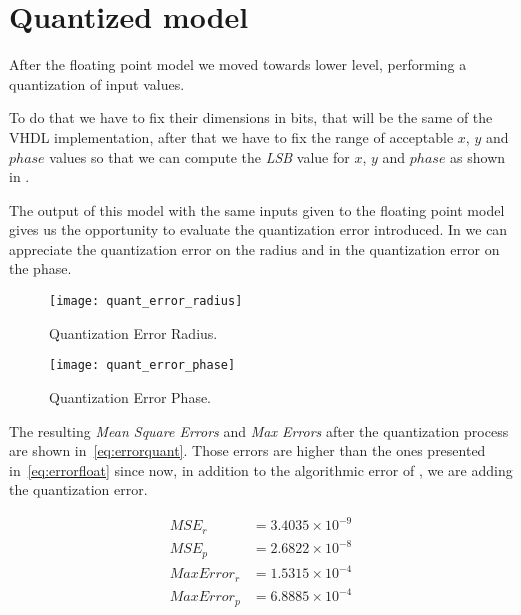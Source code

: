 \section{Quantized model}\label{sec:quantized}

After the floating point model we moved towards lower level, performing a
quantization of input values.

To do that we have to fix their dimensions in bits, that will be the same of the
VHDL implementation, after that we have to fix the range of acceptable \(x\),
\(y\) and \(phase\) values so that we can compute the \emph{LSB} value for
\(x\), \(y\) and \(phase\) as shown in .



The output of this model with the same inputs given to the floating point model
gives us the opportunity to evaluate the quantization error introduced. In
 we can appreciate the quantization error on the radius
and in  the quantization error on the phase.

\begin{figure}[htb]
	\texttt{[image: quant\_error\_radius]}
	\caption{Quantization Error Radius.}\label{fig:qerrorradius}
\end{figure}
\begin{figure}[htb]
	\texttt{[image: quant\_error\_phase]}
	\caption{Quantization Error Phase.}\label{fig:qerrorphase}
\end{figure}

The resulting \emph{Mean Square Errors} and \emph{Max Errors} after the
quantization process are shown in~\eqref{eq:errorquant}. Those errors are higher
than the ones presented in~\eqref{eq:errorfloat} since now, in addition to the
algorithmic error of \cordic, we are adding the quantization error.

\begin{equation}\label{eq:errorquant}
	\begin{array}{rl}
		MSE_r &= 3.4035\times10^{-9}\\
		MSE_p &= 2.6822\times10^{-8}\\
		MaxError_r &= 1.5315\times10^{-4}\\
		MaxError_p &= 6.8885\times10^{-4}
	\end{array}
\end{equation}
